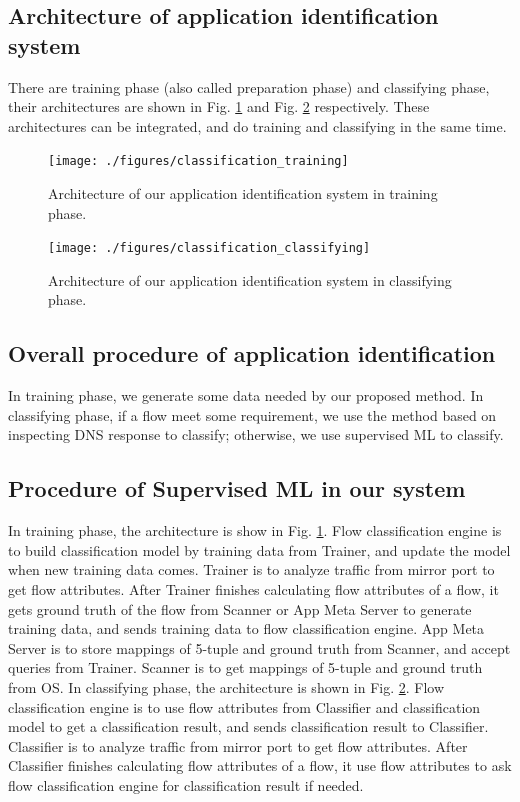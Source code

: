 \documentclass[journal]{IEEEtran}
\begin{document}
\subsection{Architecture of application identification system}
There are training phase (also called preparation phase) and classifying phase,
their architectures are shown in Fig. \ref{fig:class_training} and Fig. \ref{fig:class_classifying} respectively.
These architectures can be integrated, and do training and classifying in the same time.

\begin{figure}[!t]
\centering
\texttt{[image: ./figures/classification\_training]}
\caption{Architecture of our application identification system in training phase.}
\label{fig:class_training}
\end{figure}

\begin{figure}[!t]
\centering
\texttt{[image: ./figures/classification\_classifying]}
\caption{Architecture of our application identification system in classifying phase.}
\label{fig:class_classifying}
\end{figure}



\subsection{Overall procedure of application identification}
In training phase, we generate some data needed by our proposed method.
In classifying phase, if a flow meet some requirement, we use the method based on inspecting DNS response to classify;
otherwise, we use supervised ML to classify.

\subsection{Procedure of Supervised ML in our system}
In training phase, the architecture is show in Fig. \ref{fig:class_training}.
Flow classification engine is to build classification model by training data from Trainer,
and update the model when new training data comes.
Trainer is to analyze traffic from mirror port to get flow attributes.
After Trainer finishes calculating flow attributes of a flow,
it gets ground truth of the flow from Scanner or App Meta Server to generate training data,
and sends training data to flow classification engine.
App Meta Server is to store mappings of 5-tuple and ground truth from Scanner, and accept queries from Trainer.
Scanner is to get mappings of 5-tuple and ground truth from OS.
In classifying phase, the architecture is shown in Fig. \ref{fig:class_classifying}.
Flow classification engine is to use flow attributes from Classifier and classification model to get a classification result,
and sends classification result to Classifier.
Classifier is to analyze traffic from mirror port to get flow attributes.
After Classifier finishes calculating flow attributes of a flow,
it use flow attributes to ask flow classification engine for classification result if needed.
\end{document}
